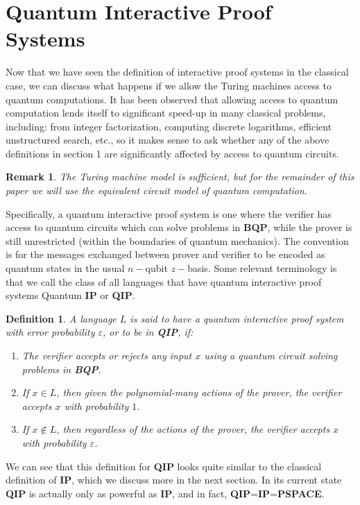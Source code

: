 \documentclass[12pt]{article}
\newtheorem{defn}{Definition}
\newtheorem{rmk}{Remark}
\numberwithin{thm}{section}
\numberwithin{defn}{section}
\numberwithin{prop}{section}
\numberwithin{rmk}{section}
\begin{document}
    \section{Quantum Interactive Proof Systems}
    Now that we have seen the definition of interactive proof systems in the classical case, we can discuss what happens if we allow the Turing machines access to quantum computations. It has been observed that allowing access to quantum computation lends itself to significant speed-up in many classical problems, including: from integer factorization, computing discrete logarithms, efficient unstructured search, etc., so it makes sense to ask whether any of the above definitions in section 1 are significantly affected by access to quantum circuits.
   
    \begin{rmk}The Turing machine model is sufficient, but for the remainder of this paper we will use the equivalent circuit model of quantum computation. \end{rmk}
    
    Specifically, a quantum interactive proof system is one where the verifier has access to quantum circuits which can solve problems in \textbf{BQP}, while the prover is still unrestricted (within the boundaries of quantum mechanics). The convention is for the messages exchanged between prover and verifier to be encoded as quantum states in the usual $n-$qubit $z-$basis. Some relevant terminology is that we call the class of all languages that have quantum interactive proof systems Quantum \textbf{IP} or \textbf{QIP}.
    \begin{defn}
    	A language $L$ is said to have a quantum interactive proof system with error probability $\varepsilon$, or to be in \textbf{QIP}, if:
    	\begin{enumerate}
    		\item The verifier accepts or rejects any input $x$ using a quantum circuit solving problems in \textbf{BQP}.
    		\item If $x\in L$, then given the polynomial-many actions of the prover, the verifier accepts $x$ with probability $1$.
    		\item If $x\notin L$, then regardless of the actions of the prover, the verifier accepts $x$ with probability $\varepsilon$.
    	\end{enumerate}
    \end{defn}

	We can see that this definition for \textbf{QIP} looks quite similar to the classical definition of \textbf{IP}, which we discuss more in the next section. In its current state \textbf{QIP} is actually only as powerful as \textbf{IP}, and in fact, \textbf{QIP}=\textbf{IP}=\textbf{PSPACE}. 
\end{document}
